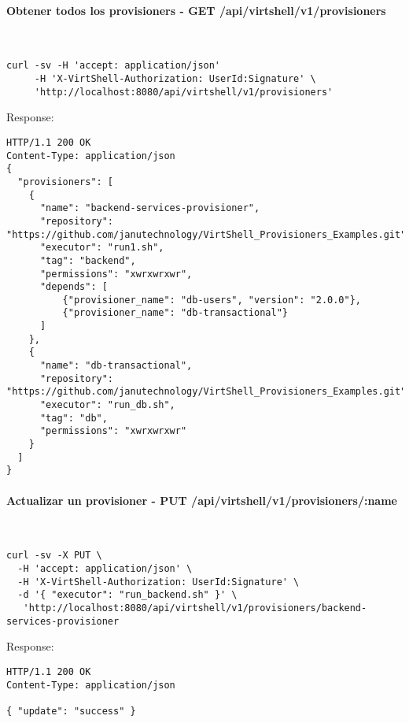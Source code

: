 \paragraph{Obtener todos los provisioners - GET /api/virtshell/v1/provisioners} ~\\

\begin{lstlisting}[style=json]
curl -sv -H 'accept: application/json' 
     -H 'X-VirtShell-Authorization: UserId:Signature' \ 
     'http://localhost:8080/api/virtshell/v1/provisioners'
\end{lstlisting}

Response:

\begin{lstlisting}[style=json]
HTTP/1.1 200 OK
Content-Type: application/json
{
  "provisioners": [
    {
      "name": "backend-services-provisioner",
      "repository": "https://github.com/janutechnology/VirtShell_Provisioners_Examples.git",
      "executor": "run1.sh",
      "tag": "backend",
      "permissions": "xwrxwrxwr",
      "depends": [
          {"provisioner_name": "db-users", "version": "2.0.0"},
          {"provisioner_name": "db-transactional"}
      ]
    },
    {
      "name": "db-transactional",
      "repository": "https://github.com/janutechnology/VirtShell_Provisioners_Examples.git",
      "executor": "run_db.sh",
      "tag": "db",
      "permissions": "xwrxwrxwr"
    }
  ]
}
\end{lstlisting}

\paragraph{Actualizar un provisioner - PUT /api/virtshell/v1/provisioners/:name} ~\\

\begin{lstlisting}[style=json]
curl -sv -X PUT \
  -H 'accept: application/json' \
  -H 'X-VirtShell-Authorization: UserId:Signature' \
  -d '{ "executor": "run_backend.sh" }' \
   'http://localhost:8080/api/virtshell/v1/provisioners/backend-services-provisioner
\end{lstlisting}

Response:

\begin{lstlisting}[style=json]
HTTP/1.1 200 OK
Content-Type: application/json

{ "update": "success" }
\end{lstlisting}

